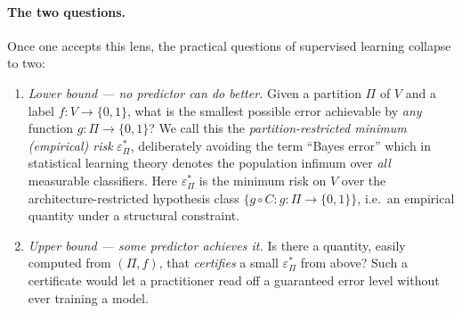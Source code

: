 \documentclass[10pt]{article}
\theoremstyle{definition}
\theoremstyle{remark}
\newcommand{\eps}{\varepsilon}
\newcommand{\epsP}{\eps^{\!*}_{\Pi}}
\begin{document}
\paragraph{The two questions.} Once one accepts this lens, the
practical questions of supervised learning collapse to two:
\begin{enumerate}[(Q1)]
  \item \emph{Lower bound --- no predictor can do better.} Given
    a partition $\Pi$ of $V$ and a label $f : V \to \{0, 1\}$,
    what is the smallest possible error achievable by \emph{any}
    function $g : \Pi \to \{0, 1\}$? We call this the
    \emph{partition-restricted minimum (empirical) risk} $\epsP$,
    deliberately avoiding the term ``Bayes error'' which in
    statistical learning theory denotes the population infimum
    over \emph{all} measurable classifiers. Here $\epsP$ is the
    minimum risk on $V$ over the architecture-restricted
    hypothesis class $\{g \circ C : g : \Pi \to \{0, 1\}\}$, i.e.\
    an empirical quantity under a structural constraint.
  \item \emph{Upper bound --- some predictor achieves it.} Is
    there a quantity, easily computed from $(\Pi, f)$, that
    \emph{certifies} a small $\epsP$ from above? Such a
    certificate would let a practitioner read off a guaranteed
    error level without ever training a model.
\end{enumerate}
\end{document}
